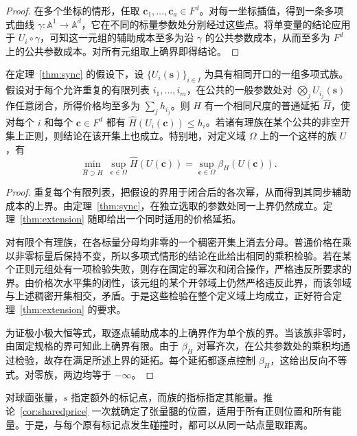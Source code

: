 \begin{proof}
在多个坐标的情形，任取 $\mathbf c_1,\ldots,\mathbf c_a\in F^d$。对每一坐标插值，得到一条多项式曲线 $\gamma:\mathbb A^1\to\mathbb A^d$，它在不同的标量参数处分别经过这些点。将单变量的结论应用于 $U_i\circ\gamma$，可知这一元组的辅助成本至多为沿 $\gamma$ 的公共参数成本，从而至多为 $F^d$ 上的公共参数成本。对所有元组取上确界即得结论。
\end{proof}

\begin{corollary}[同时定价]\label{cor:sharedprice}
在定理~\ref{thm:sync} 的假设下，设 $\{U_i(\mathbf s)\}_{i\in I}$ 为具有相同开口的一组多项式族。假设对于每个允许重复的有限列表 $i_1,\ldots,i_m$，在公共的一般参数处对 $\bigotimes_j U_{i_j}(\mathbf s)$ 作任意闭合，所得价格均至多为 $\sum_j h_{i_j}$。则 $H$ 有一个相同尺度的普通延拓 $\widehat H$，使对每个 $i$ 和每个 $\mathbf c\in F^d$ 都有 $\widehat H(U_i(\mathbf c))\le h_i$。若诸有理族在某个公共的非空开集上正则，则结论在该开集上也成立。特别地，对定义域 $\Omega$ 上的一个这样的族 $U$，有
\[
 \min_{\widehat H\supset H}\ \sup_{\mathbf c\in\Omega}\widehat H(U(\mathbf c))
    =\sup_{\mathbf c\in\Omega}\beta_H(U(\mathbf c)).
\]
\end{corollary}

\begin{proof}
重复每个有限列表，把假设的界用于闭合后的各次幂，从而得到其同步辅助成本的上界。由定理~\ref{thm:sync}，在独立选取的参数处同一上界仍然成立。定理~\ref{thm:extension} 随即给出一个同时适用的价格延拓。

对有限个有理族，在各标量分母均非零的一个稠密开集上消去分母。普通价格在乘以非零标量后保持不变，所以多项式情形的结论在此给出相同的乘积检验。若在某个正则元组处有一项检验失败，则存在固定的幂次和闭合操作，严格违反所要求的界。由价格次水平集的闭性，该元组的某个开邻域上仍然严格违反此界，而该邻域与上述稠密开集相交，矛盾。于是这些检验在整个定义域上均成立，正好符合定理~\ref{thm:extension} 的要求。

为证极小极大恒等式，取逐点辅助成本的上确界作为单个族的界。当该族非零时，由固定规格的界可知此上确界有限。由于 $\beta_H$ 对幂齐次，在公共参数处的乘积均通过检验，故存在满足所述上界的延拓。每个延拓都逐点控制 $\beta_H$，这给出反向不等式。对零族，两边均等于 $-\infty$。
\end{proof}

对球面张量，$s$ 指定额外的标记点，而族的指标指定其能量。推论~\ref{cor:sharedprice} 一次就确定了张量腿的位置，适用于所有正则位置和所有能量。于是，与每个原有标记点发生碰撞时，都可以从同一站点量取距离。
